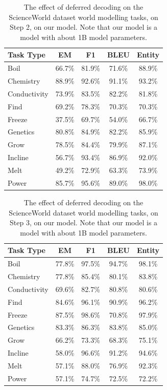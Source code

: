 \begin{table}[h]
\centering
    \setlength\tabcolsep{15pt}
    \setlength\extrarowheight{0pt}
\caption{The effect of deferred decoding on the ScienceWorld dataset \citep{wang-etal-2022-scienceworld} world modelling tasks, on Step 2, on our model. Note that our model is a model with about 1B model parameters.}
\label{tab:scienceworld25}
\begin{tabular}{lcccc}
\toprule
\textbf{Task Type} & \textbf{EM} & \textbf{F1}
  & \textbf{BLEU} & \textbf{Entity}\\
\midrule
Boil & 66.7\% & 81.9\% & 71.6\% & 88.9\% \\
Chemistry & 88.9\% & 92.6\% & 91.1\% & 93.2\% \\
Conductivity & 73.9\% & 83.5\% & 82.2\% & 81.8\% \\
Find & 69.2\% & 78.3\% & 70.3\% & 70.3\% \\
Freeze & 37.5\% & 69.7\% & 54.0\% & 66.7\% \\
Genetics & 80.8\% & 84.9\% & 82.2\% & 85.9\% \\
Grow & 78.5\% & 84.4\% & 79.9\% & 87.1\% \\
Incline & 56.7\% & 93.4\% & 86.9\% & 92.0\% \\
Melt & 49.2\% & 72.9\% & 63.3\% & 73.9\% \\
Power & 85.7\% & 95.6\% & 89.0\% & 98.0\% \\

\bottomrule
\end{tabular}
\end{table}


\begin{table}[h]
\centering
    \setlength\tabcolsep{15pt}
    \setlength\extrarowheight{0pt}
\caption{The effect of deferred decoding on the ScienceWorld dataset \citep{wang-etal-2022-scienceworld} world modelling tasks, on Step 3, on our model. Note that our model is a model with about 1B model parameters.}
\label{tab:scienceworld26}
\begin{tabular}{lcccc}
\toprule
\textbf{Task Type} & \textbf{EM} & \textbf{F1}
  & \textbf{BLEU} & \textbf{Entity}\\
\midrule
Boil & 77.8\% & 97.5\% & 94.7\% & 98.1\% \\
Chemistry & 77.8\% & 85.4\% & 80.1\% & 83.8\% \\
Conductivity & 69.6\% & 82.7\% & 80.8\% & 80.6\% \\
Find & 84.6\% & 96.1\% & 90.9\% & 96.2\% \\
Freeze & 87.5\% & 98.6\% & 70.8\% & 97.9\% \\
Genetics & 83.3\% & 86.3\% & 83.8\% & 85.0\% \\
Grow & 66.2\% & 73.3\% & 68.3\% & 75.1\% \\
Incline & 58.0\% & 96.6\% & 91.2\% & 94.6\% \\
Melt & 57.1\% & 88.0\% & 76.9\% & 92.3\% \\
Power & 57.1\% & 74.7\% & 72.5\% & 72.2\% \\

\bottomrule
\end{tabular}
\end{table}



